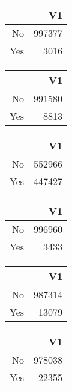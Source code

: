 \bigskip\bigskip
\centering
\begin{tabular}{rr}
  \hline
 & V1 \\ 
  \hline
No & 997377 \\ 
  Yes & 3016 \\ 
   \hline
\end{tabular}

\bigskip\bigskip
\centering
\begin{tabular}{rr}
  \hline
 & V1 \\ 
  \hline
No & 991580 \\ 
  Yes & 8813 \\ 
   \hline
\end{tabular}

\bigskip\bigskip
\centering
\begin{tabular}{rr}
  \hline
 & V1 \\ 
  \hline
No & 552966 \\ 
  Yes & 447427 \\ 
   \hline
\end{tabular}

\bigskip\bigskip
\centering
\begin{tabular}{rr}
  \hline
 & V1 \\ 
  \hline
No & 996960 \\ 
  Yes & 3433 \\ 
   \hline
\end{tabular}

\bigskip\bigskip
\centering
\begin{tabular}{rr}
  \hline
 & V1 \\ 
  \hline
No & 987314 \\ 
  Yes & 13079 \\ 
   \hline
\end{tabular}

\bigskip\bigskip
\centering
\begin{tabular}{rr}
  \hline
 & V1 \\ 
  \hline
No & 978038 \\ 
  Yes & 22355 \\ 
   \hline
\end{tabular}

